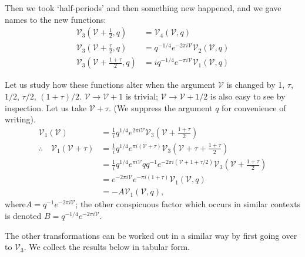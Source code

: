 Then we took `half-periods' and then something new happened, and we
gave names to the new functions:
\begin{equation*}
  \begin{aligned}
    \mathscr{V}_3 \left(\mathscr{V}+ \frac{1}{2}, q\right) & =
    \mathscr{V}_4 (\mathscr{V}, q)\\
    \mathscr{V}_3 \left(\mathscr{V}+ \frac{\tau}{2}, q\right) & =
    q^{-1/4} e^{-2 \pi i \mathscr{V}} \mathscr{V}_2 (\mathscr{V}, q)\\
    \mathscr{V}_3 \left(\mathscr{V}+ \frac{1+\tau}{2}, q\right) & =
    i q^{-1/4} e^{- \pi i \mathscr{V}} \mathscr{V}_1 (\mathscr{V}, q)    
  \end{aligned}\tag{6}\label{part2:lec10:eq6}
\end{equation*}

Let us study how these functions alter when the argument $\mathscr{V}$
is changed by 1, $\tau$, $1/2$, $\tau/2$, $(1+
\tau)/2$. $\mathscr{V}\to \mathscr{V}+1$ is trivial; $\mathscr{V}\to
\mathscr{V}+1/2$ is also easy to see by inspection. Let us take
$\mathscr{V}+\tau$. (We suppress the argument $q$ for convenience of
writing). 
\begin{align*}
  \mathscr{V}_1 (\mathscr{V}) &= \frac{1}{i} q^{1/4} e^{2 \pi i
    \mathscr{V}} \mathscr{V}_3 \left(\mathscr{V}+ \frac{1+ \tau}{2}
  \right)\\
  \therefore \quad  \mathscr{V}_1 (\mathscr{V}+ \tau) & = \frac{1}{i}
  q^{1/4} e^{\pi i (\mathscr{V} + \tau)} \mathscr{V}_3 \left(\mathscr{V}+
  \tau+ \frac{1+\tau}{2}\right)\\
  & = \frac{1}{i} q^{1/4} e^{\pi i \mathscr{V}} q q^{-1} e^{- 2 \pi
    i(\mathscr{V}+1+ \tau/2)} \mathscr{V}_3 \left(\mathscr{V}+
  \frac{1+\tau}{2}\right)\\
  & = e^{-2 \pi i \mathscr{V}} e^{-\pi i (1+ \tau)} \mathscr{V}_1
  (\mathscr{V}, q)\\
  & = -A \mathscr{V}_1 (\mathscr{V}, q),
\end{align*}
where\pageoriginale $A= q^{-1} e^{-2 \pi i \mathscr{V}}$; the other conspicuous
factor which occurs in similar contexts is denoted $B= q^{-1/4} e^{-2
  \pi i \mathscr{V}}$.

The other transformations can be worked out in a similar way by first
going over to $\mathscr{V}_3$. We collect the results below in tabular
form. 

